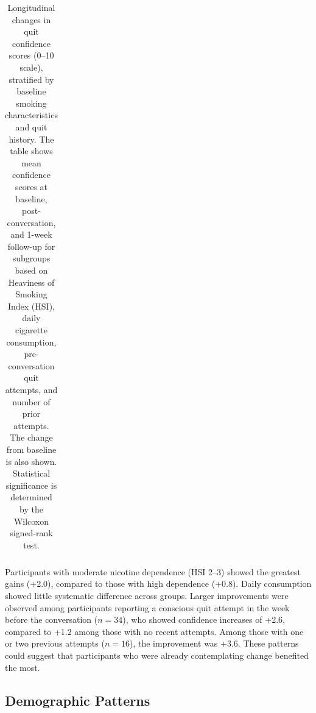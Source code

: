 \begin{table}[ht!]
\begin{tabular*}{\linewidth}{@{\extracolsep{\fill}}lccccc@{}}
    \bottomrule
  \end{tabular*}
  \caption[Confidence Changes by Smoking Characteristics]{Longitudinal changes in quit confidence scores (0--10 scale), stratified by baseline smoking characteristics and quit history. The table shows mean confidence scores at baseline, post-conversation, and 1-week follow-up for subgroups based on Heaviness of Smoking Index (HSI), daily cigarette consumption, pre-conversation quit attempts, and number of prior attempts. The change from baseline is also shown. Statistical significance is determined by the Wilcoxon signed-rank test.}
  \label{tab:hsi_prequit}
\end{table}


Participants with moderate nicotine dependence (HSI 2--3) showed the greatest gains (+2.0), compared to those with high dependence  (+0.8). Daily consumption showed little systematic difference across groups. Larger improvements were observed among participants reporting a conscious quit attempt in the week before the conversation ($n=34$), who showed confidence increases of +2.6, compared to +1.2 among those with no recent attempts. Among those with one or two previous attempts ($n=16$), the improvement was +3.6. These patterns could suggest that participants who were already contemplating change benefited the most.

\subsection*{Demographic Patterns}

